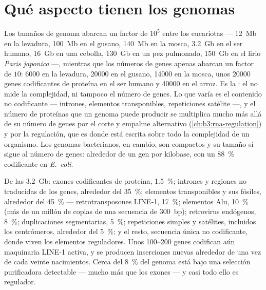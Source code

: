 \section{Qué aspecto tienen los genomas}

\begin{proposition}\label{prop:b3:genomics:sizes}
Los tamaños de genoma abarcan un factor de $10^{5}$ entre los eucariotas
--- \qty{12}{Mb} en la levadura, \qty{100}{Mb} en el gusano,
\qty{140}{Mb} en la mosca, \qty{3.2}{Gb} en el ser humano, \qty{16}{Gb}
en una cebolla, \qty{130}{Gb} en un pez pulmonado, \qty{150}{Gb} en el
lirio \emph{Paris japonica} ---, mientras que los números de genes apenas
abarcan un factor de $10$: \num{6000} en la levadura, \num{20000} en el
gusano, \num{14000} en la mosca, unos \num{20000} genes codificantes de
proteína en el ser humano y \num{40000} en el arroz. Es la \emph{}: el  no mide la complejidad, ni tampoco el
número de genes. Lo que varía es el contenido no codificante --- intrones,
elementos transponibles, repeticiones satélite ---, y el número de
proteínas que un genoma puede producir se multiplica mucho más allá de su
número de genes por el corte y empalme alternativo
(\cref{ch:b3:rna-regulation}) y por la regulación, que es donde está
escrita sobre todo la complejidad de un organismo. Los genomas
bacterianos, en cambio, son compactos y su tamaño sí sigue al número de
genes: alrededor de un gen por kilobase, con un \qty{88}{\%} codificante
en \emph{E.~coli}.
\end{proposition}

\begin{example}\label{ex:b3:genomics:content}
De las \qty{3.2}{Gb}: exones codificantes de proteína, \qty{1.5}{\%};
intrones y regiones no traducidas de los genes, alrededor del
\qty{35}{\%}; elementos transponibles y sus fósiles, alrededor del
\qty{45}{\%} --- retrotransposones LINE-1, \qty{17}{\%}; elementos Alu,
\qty{10}{\%} (más de un millón de copias de una secuencia de
\qty{300}{bp}); retrovirus endógenos, \qty{8}{\%}; duplicaciones
segmentarias, \qty{5}{\%}; repeticiones simples y satélites, incluidos
los centrómeros, alrededor del \qty{5}{\%}; y el resto, secuencia única
no codificante, donde viven los elementos reguladores. Unos
\numrange{100}{200} genes codifican aún maquinaria LINE-1 activa, y se
producen inserciones nuevas alrededor de una vez de cada veinte
nacimientos. Cerca del \qty{8}{\%} del genoma está bajo una selección
purificadora detectable --- mucho más que los exones --- y casi todo ello
es regulador.
\end{example}

